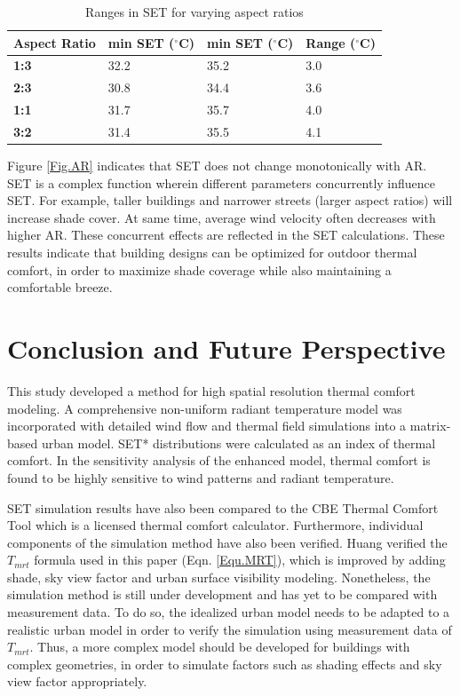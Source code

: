 \documentclass[preprint,3p,12pt,english]{elsarticle}
\begin{document}
\begin{table}[]
\centering
\caption{Ranges in SET for varying aspect ratios}
\label{table:AR_range}
\begin{tabular}{llll}
  Aspect Ratio  & \textbf{min SET ($^{\circ}$C)} & \textbf{min SET ($^{\circ}$C)} & \textbf{Range ($^{\circ}$C)}\\ \hline
\multicolumn{1}{l|}{\textbf{1:3}} &     32.2      &     35.2      &   3.0        \\
\multicolumn{1}{l|}{\textbf{2:3}} &      30.8     &     34.4      &  3.6         \\
\multicolumn{1}{l|}{\textbf{1:1}} &      31.7     &     35.7      &   4.0       \\
\multicolumn{1}{l|}{\textbf{3:2}} &      31.4     &      35.5     &  4.1        
\end{tabular}
\end{table}

Figure \ref{Fig.AR} indicates that SET does not change monotonically with AR. SET is a complex function wherein different parameters concurrently influence SET.  For example, taller buildings and narrower streets (larger aspect ratios) will increase shade cover. At same time, average wind velocity often decreases with higher AR. These concurrent effects are reflected in the SET calculations. These results indicate that building designs can be optimized for outdoor thermal comfort, in order to maximize shade coverage while also maintaining a comfortable breeze.  





\section{Conclusion and Future Perspective}
This study developed a method for high spatial resolution thermal comfort modeling. A comprehensive non-uniform radiant temperature model was incorporated with detailed wind flow and thermal field simulations into a matrix-based urban model. SET* distributions were calculated as an index of thermal comfort. In the sensitivity analysis of the enhanced model, thermal comfort is found to be highly sensitive to wind patterns and radiant temperature. 

SET simulation results have also been compared to the CBE Thermal Comfort Tool \cite{hoyt2013cbe} which is a licensed thermal comfort calculator. Furthermore, individual components of the simulation method have also been verified. Huang \cite{huang2014citycomfort+} verified the $T_{mrt}$ formula used in this paper (Eqn. \ref{Equ.MRT}), which is improved by adding shade, sky view factor and urban surface visibility modeling. 
Nonetheless, the simulation method is still under development and has yet to be compared with measurement data.  To do so, the idealized urban model needs to be adapted to a realistic urban model in order to verify the simulation using measurement data of $T_{mrt}$. Thus, a more complex model should be developed for buildings with complex geometries, in order to simulate factors such as shading effects and sky view factor appropriately.
\end{document}
